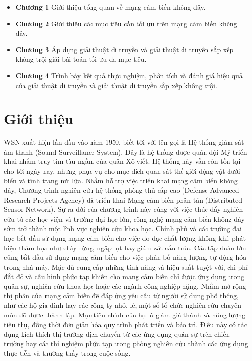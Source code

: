 \documentclass{hust}
\begin{document}
\begin{itemize}
	\item \textbf{Chương 1} Giới thiệu tổng quan về mạng cảm biến không dây.
	\item \textbf{Chương 2} Giới thiệu các mục tiêu cần tối ưu trên mạng cảm biến không dây.
	\item \textbf{Chương 3} Áp dụng giải thuật di truyền và giải thuật di truyền sắp xếp không trội giải bài toán tối ưu đa mục tiêu.
	\item \textbf{Chương 4} Trình bày kết quả thực nghiệm, phân tích và đánh giá hiệu quả của giải thuật di truyền và giải thuật di truyền sắp xếp không trội.
\end{itemize}

\pagebreak

\printnoidxglossaries
\pagebreak

\listoftables
\listoffigures

\newpage
\tableofcontents
\newpage

\acresetall

\chapter{Giới thiệu}
\Gls{WSN} xuất hiện lần đầu vào năm 1950, biết tới với tên gọi là Hệ thống giám sát âm thanh (Sound Surveillance System). Đây là hệ thống được quân đội Mỹ triển khai nhằm truy tìm tàu ngầm của quân Xô-viết. Hệ thống này vẫn còn tồn tại cho tới ngày nay, nhưng phục vụ cho mục đích quan sát thế giới động vật dưới biển và tình trạng núi lửa.
Nhằm hỗ trợ việc triển khai mạng cảm biến không dây, Chương trình nghiên cứu hệ thống phòng thủ cấp cao (Defense Advanced Research Projects Agency) đã triển khai Mạng cảm biến phân tán (Distributed Sensor Network). Sự ra đời của chương trình này cùng với việc thúc đẩy nghiên cứu từ các học viện và trường đại học lớn, công nghệ mạng cảm biến không dây sớm trở thành một lĩnh vực nghiên cứu khoa học. Chính phủ và các trường đại học bắt đầu sử dụng mạng cảm biến cho việc đo đạc chất lượng không khí, phát hiện thảm họa như cháy rừng, ngập lụt hay giám sát cấu trúc. Các tập đoàn lớn cũng bắt đầu sử dụng mạng cảm biến cho việc phân bố năng lượng, tự động hóa trong nhà máy.
Mặc dù cung cấp những tính năng và hiệu suất tuyệt vời, chi phí đắt đỏ và cấu hình phức tạp khiến cho mạng cảm biến chỉ được ứng dụng trong quân sự, nghiên cứu khoa học hoặc các ngành công nghiệp nặng. Nhằm mở rộng thị phần của mạng cảm biến để đáp ứng yêu cầu từ người sử dụng phổ thông, như các hộ gia đình hay các công ty nhỏ, lẻ, một số tổ chức nghiên cứu chuyên môn đã được thành lập. Mục tiêu chính của họ là giảm giá thành và năng lượng tiêu thụ, đồng thời đơn giản hóa quy trình phát triển và bảo trì. Điều này có tác dụng kích thích thị trường dịch chuyển từ các ứng dụng quân sự trên chiến trường hay các thí nghiệm phức tạp trong phòng nghiên cứu thành các ứng dụng thực tiễn và thường thấy trong cuộc sống.
\cite{benefit1evolution}
\end{document}
